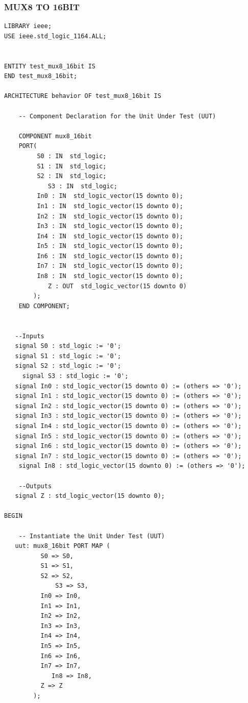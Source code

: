 \documentclass{article}
\begin{document}
\subsubsection{MUX8 TO 16BIT}\label{sec:result}

\begin{lstlisting}
LIBRARY ieee;
USE ieee.std_logic_1164.ALL;

 
ENTITY test_mux8_16bit IS
END test_mux8_16bit;
 
ARCHITECTURE behavior OF test_mux8_16bit IS 
 
    -- Component Declaration for the Unit Under Test (UUT)
 
    COMPONENT mux8_16bit
    PORT(
         S0 : IN  std_logic;
         S1 : IN  std_logic;
         S2 : IN  std_logic;
			S3 : IN  std_logic;
         In0 : IN  std_logic_vector(15 downto 0);
         In1 : IN  std_logic_vector(15 downto 0);
         In2 : IN  std_logic_vector(15 downto 0);
         In3 : IN  std_logic_vector(15 downto 0);
         In4 : IN  std_logic_vector(15 downto 0);
         In5 : IN  std_logic_vector(15 downto 0);
         In6 : IN  std_logic_vector(15 downto 0);
         In7 : IN  std_logic_vector(15 downto 0);
         In8 : IN  std_logic_vector(15 downto 0);
			Z : OUT  std_logic_vector(15 downto 0)
        );
    END COMPONENT;
    

   --Inputs
   signal S0 : std_logic := '0';
   signal S1 : std_logic := '0';
   signal S2 : std_logic := '0';
	 signal S3 : std_logic := '0';
   signal In0 : std_logic_vector(15 downto 0) := (others => '0');
   signal In1 : std_logic_vector(15 downto 0) := (others => '0');
   signal In2 : std_logic_vector(15 downto 0) := (others => '0');
   signal In3 : std_logic_vector(15 downto 0) := (others => '0');
   signal In4 : std_logic_vector(15 downto 0) := (others => '0');
   signal In5 : std_logic_vector(15 downto 0) := (others => '0');
   signal In6 : std_logic_vector(15 downto 0) := (others => '0');
   signal In7 : std_logic_vector(15 downto 0) := (others => '0');
	signal In8 : std_logic_vector(15 downto 0) := (others => '0');

 	--Outputs
   signal Z : std_logic_vector(15 downto 0);
 
BEGIN
 
	-- Instantiate the Unit Under Test (UUT)
   uut: mux8_16bit PORT MAP (
          S0 => S0,
          S1 => S1,
          S2 => S2,
			  S3 => S3,
          In0 => In0,
          In1 => In1,
          In2 => In2,
          In3 => In3,
          In4 => In4,
          In5 => In5,
          In6 => In6,
          In7 => In7,
			 In8 => In8,
          Z => Z
        );


\end{lstlisting}
\end{document}
